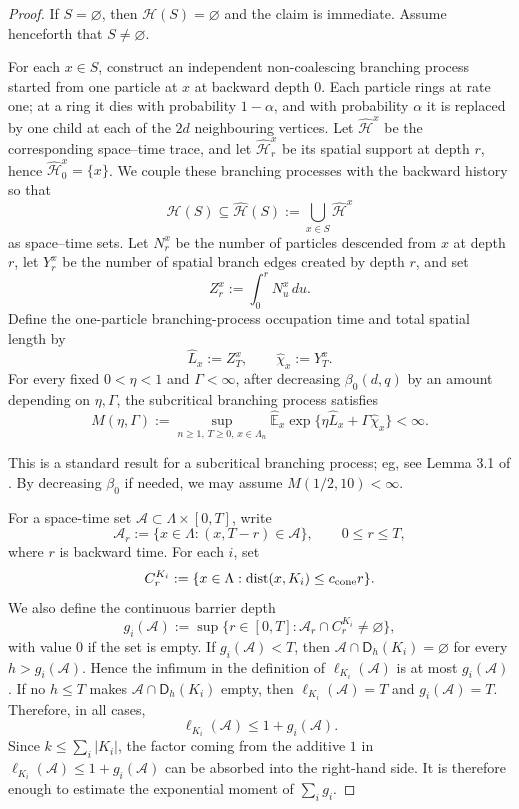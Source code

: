 \documentclass[letterpaper,11pt,reqno]{amsart}
\theoremstyle{definition}
\newcommand{\dist}{\mathrm{dist}}
\begin{document}
\begin{proof}
If \(S=\varnothing\), then \(\mathcal H(S)=\varnothing\) and the claim is
immediate.  Assume henceforth that \(S\ne\varnothing\).

For each \(x\in S\), construct an independent non-coalescing branching process
started from one particle at \(x\) at backward depth \(0\). Each particle rings
at rate one; at a ring it dies with probability \(1-\alpha\), and with
probability \(\alpha\) it is replaced by one child at each of the \(2d\)
neighbouring vertices. Let \(\widehat{\mathcal H}^x\) be the corresponding
space--time trace, and let \(\widehat{\mathcal H}^x_r\) be its spatial support
at depth \(r\), hence $\widehat{\mathcal H}^x_0=\{x\}$. We couple these branching processes with the backward history so
that
\[
        \mathcal H(S)\subseteq
        \widehat{\mathcal H}(S):=
        \bigcup_{x\in S}\widehat{\mathcal H}^x
\]
as space--time sets.
Let \(N_r^x\) be the number of particles descended from \(x\) at
depth \(r\), let \(Y_r^x\) be the number of spatial branch edges created by
depth \(r\), and set
\[
        Z_r^x:=\int_0^r N_u^x\,du .
\]
Define the one-particle branching-process occupation time and total spatial length by
\[
        \widehat L_x:=Z_T^x,
        \qquad
        \widehat\chi_x:=Y_T^x .
\]
For every fixed \(0<\eta<1\) and \(\Gamma<\infty\), after decreasing
\(\beta_0(d,q)\) by an amount depending on \(\eta,\Gamma\), the subcritical
branching process satisfies
\begin{equation}\label{eq:subBP-exp}
    M(\eta,\Gamma)
        :=
        \sup_{n\ge1,\,T\ge0,\,x\in\Lambda_n}
        \widehat{\mathbb E}_x
        \exp\{\eta\widehat L_x+\Gamma\widehat\chi_x\}
        <\infty .
\end{equation}
        
This is a standard result for a subcritical branching process; eg, see Lemma 3.1 of \cite{Exposition}. By decreasing $\beta_0$ if needed, we may assume $M(1/2,10)<\infty$.

For a space-time set $\mathcal A\subset\Lambda\times[0,T]$, write
\[
        \mathcal A_r:=\{x\in\Lambda:(x,T-r)\in \mathcal A   \},
        \qquad 0\le r\le T,
\]
where \(r\) is backward time. For each \(i\), set
\[
        C^{K_i}_r:=\{x\in\Lambda:\dist(x,K_i)\le c_{\rm cone}r\}.
\]
We also define the continuous barrier depth
\[
        g_i(\mathcal A):=
        \sup\{r\in[0,T]:\mathcal A_r\cap C^{K_i}_r\ne\varnothing\},
\]
with value \(0\) if the set is empty.
If \(g_i(\mathcal A)<T\), then \(\mathcal A\cap\mathsf D_h(K_i)=\varnothing\) for every
\(h>g_i(\mathcal A)\). Hence the infimum in the definition of \(\ell_{K_i}(\mathcal A)\) is at
most \(g_i(\mathcal A)\). If no \(h\le T\) makes \(\mathcal A\cap\mathsf D_h(K_i)\) empty, then
\(\ell_{K_i}(\mathcal A)=T\) and \(g_i(\mathcal A)=T\). Therefore, in all cases,
\[
        \ell_{K_i}(\mathcal A)\le 1+g_i(\mathcal A).
\]
Since \(k\le\sum_i |K_i|\), the factor coming from the additive \(1\) in
\(\ell_{K_i}(\mathcal A)\le1+g_i(\mathcal A)\) can be absorbed into the right-hand side. It is
therefore enough to estimate the exponential moment of \(\sum_i g_i\).


\end{proof}
\end{document}
